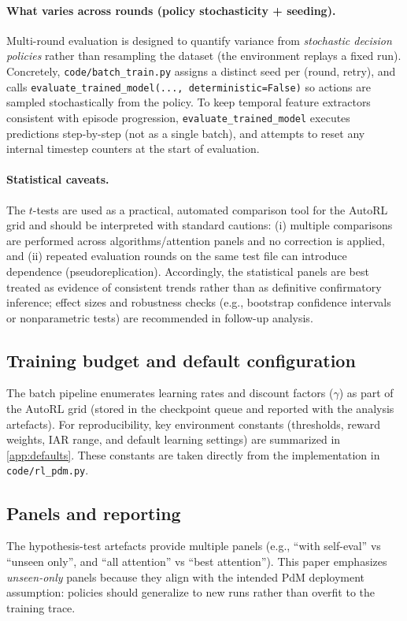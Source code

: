 \documentclass[11pt]{article}
\begin{document}
\paragraph{What varies across rounds (policy stochasticity + seeding).}
Multi-round evaluation is designed to quantify variance from \emph{stochastic decision policies} rather than resampling the dataset (the environment replays a fixed run). Concretely, \texttt{code/batch\_train.py} assigns a distinct seed per (round, retry), and calls \texttt{evaluate\_trained\_model(..., deterministic=False)} so actions are sampled stochastically from the policy. To keep temporal feature extractors consistent with episode progression, \texttt{evaluate\_trained\_model} executes predictions step-by-step (not as a single batch), and attempts to reset any internal timestep counters at the start of evaluation.

\paragraph{Statistical caveats.}
The $t$-tests are used as a practical, automated comparison tool for the AutoRL grid and should be interpreted with standard cautions: (i) multiple comparisons are performed across algorithms/attention panels and no correction is applied, and (ii) repeated evaluation rounds on the same test file can introduce dependence (pseudoreplication). Accordingly, the statistical panels are best treated as evidence of consistent trends rather than as definitive confirmatory inference; effect sizes and robustness checks (e.g., bootstrap confidence intervals or nonparametric tests) are recommended in follow-up analysis.

\subsection{Training budget and default configuration}
The batch pipeline enumerates learning rates and discount factors ($\gamma$) as part of the AutoRL grid (stored in the checkpoint queue and reported with the analysis artefacts). For reproducibility, key environment constants (thresholds, reward weights, IAR range, and default learning settings) are summarized in \cref{app:defaults}. These constants are taken directly from the implementation in \texttt{code/rl\_pdm.py}.

\subsection{Panels and reporting}
The hypothesis-test artefacts provide multiple panels (e.g., ``with self-eval'' vs ``unseen only'', and ``all attention'' vs ``best attention''). This paper emphasizes \emph{unseen-only} panels because they align with the intended PdM deployment assumption: policies should generalize to new runs rather than overfit to the training trace.
\end{document}
